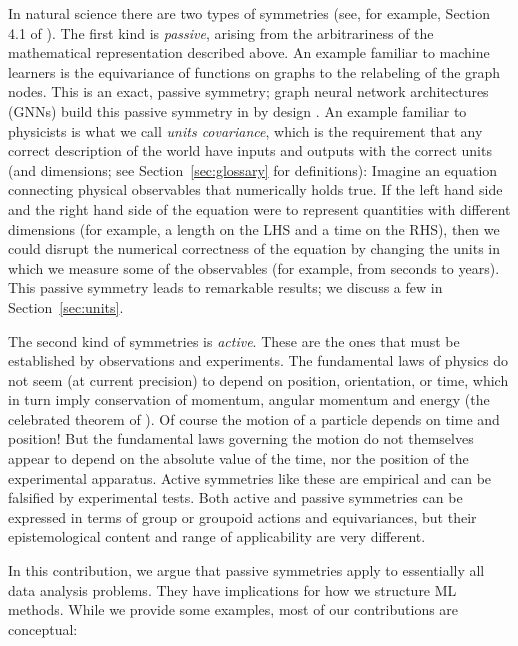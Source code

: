 \documentclass[preprint]{article} %
\newcommand{\sectionname}{Section}
\newcommand{\secref}[1]{\sectionname~\ref{#1}}
\begin{document}
In natural science there are two types of symmetries (see, for example, Section 4.1 of \citealt{rovelli2000loop}). 
The first kind is \emph{passive}, arising from the arbitrariness of the mathematical representation described above.
An example familiar to machine learners is the equivariance of functions on graphs to the relabeling of the graph nodes.
This is an exact, passive symmetry; graph neural network architectures (GNNs) build this passive symmetry in by design \citep{bruna2013spectral, duvenaud2015convolutional, gilmer2017neural}. 
An example familiar to physicists is what we call \emph{units covariance}, which is the requirement that any correct description of the world have inputs and outputs with the correct units (and dimensions; see \secref{sec:glossary} for definitions):
Imagine an equation connecting physical observables that numerically holds true.
If the left hand side and the right hand side of the equation were to represent quantities with different dimensions (for example, a length on the LHS and a time on the RHS), then we could disrupt the numerical correctness of the equation by changing the units in which we measure some of the observables (for example, from seconds to years).
This passive symmetry leads to remarkable results; we discuss a few in \secref{sec:units}.

The second kind of symmetries is \emph{active}.
These are the ones that must be established by observations and experiments.
The fundamental laws of physics do not seem (at current precision) to depend on position, orientation, or time, which in turn imply conservation of momentum, angular momentum and energy (the celebrated theorem of \citealt{noether}).
Of course the motion of a particle depends on time and position! But the fundamental laws governing the motion do not themselves appear to depend on the absolute value of the time, nor the position of the experimental apparatus.
Active symmetries like these are empirical and can be falsified by experimental tests.
Both active and passive symmetries can be expressed in terms of group or groupoid actions and equivariances, but their epistemological content and range of applicability are very different. 

In this contribution, we argue that passive symmetries apply to essentially all data analysis problems.
They have implications for how we structure ML methods. While we provide some examples, most of our contributions are conceptual:
\end{document}
